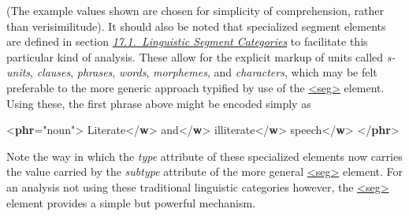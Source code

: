 (The example values shown are chosen for simplicity of comprehension, rather than verisimilitude). It should also be noted that specialized segment elements are defined in section \textit{\hyperref[AILC]{17.1.\ Linguistic Segment Categories}} to facilitate this particular kind of analysis. These allow for the explicit markup of units called \textit{s-units}, \textit{clauses}, \textit{phrases}, \textit{words}, \textit{morphemes}, and \textit{characters}, which may be felt preferable to the more generic approach typified by use of the \hyperref[TEI.seg]{<seg>} element. Using these, the first phrase above might be encoded simply as \par\bgroup{}\exampleFont \begin{shaded}\noindent\mbox{}{<\textbf{phr}\hspace*{1em}{type}="{noun}">}\mbox{}\newline 
{}Literate{</\textbf{w}>}\mbox{}\newline 
{}and{</\textbf{w}>}\mbox{}\newline 
{}illiterate{</\textbf{w}>}\mbox{}\newline 
{}speech{</\textbf{w}>}\mbox{}\newline 
{</\textbf{phr}>}\end{shaded}\egroup\par \noindent  Note the way in which the {\itshape type} attribute of these specialized elements now carries the value carried by the {\itshape subtype} attribute of the more general \hyperref[TEI.seg]{<seg>} element. For an analysis not using these traditional linguistic categories however, the \hyperref[TEI.seg]{<seg>} element provides a simple but powerful mechanism.\par
